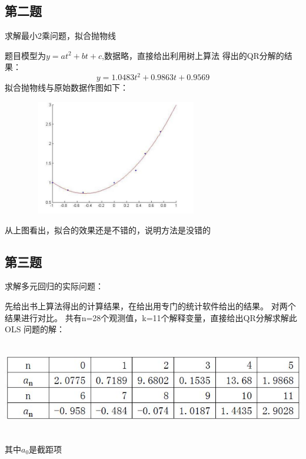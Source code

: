 \documentclass{ctexart}
\begin{document}
\subsection*{第二题}
求解最小2乘问题，拟合抛物线

题目模型为$y=at^2+bt+c$,数据略，直接给出利用树上算法
得出的QR分解的结果：
\[y=1.0483t^2+0.9863t+0.9569\]
拟合抛物线与原始数据作图如下：
\par
\centerline{\includegraphics[height=5cm,width=10cm]{4.jpg}}
\par
从上图看出，拟合的效果还是不错的，说明方法是没错的
\subsection*{第三题}
求解多元回归的实际问题：

先给出书上算法得出的计算结果，在给出用专门的统计软件给出的结果。
对两个结果进行对比。
共有n=28个观测值，k=11个解释变量，直接给出QR分解求解此OLS
问题的解：
\par
\centerline{\includegraphics[height=4cm,width=20cm]{99.jpg}}
\par

其中$a_0$是截距项
\end{document}

